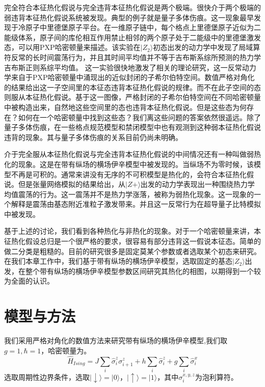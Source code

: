 完全符合本征热化假说与完全违背本征热化假说是两个极端。很快介于两个极端的弱违背本征热化假说系统被发现。典型的例子就是量子多体伤痕。这一现象最早发现于冷原子中里德堡原子平台\cite{bernien2017probing}。在一维原子链中，每个格点上里德堡原子近似为二能级体系，原子间的库伦相互作用禁止相邻的两个原子处于二能级中的里德堡激发态，可以用PXP哈密顿量来描述。该实验在$|Z_2\rangle$初态出发的动力学中发现了局域算符反常的长时间震荡行为，并且其时间平均值并不等于吉布斯系综所预测的热力学吉布斯正则系综平均值。
这一实验很快地激发了相关的理论研究\cite{turner2018weak,Turner2018quantum,Ho2019periodic,Choi2019emergent,Michailidis2020slow,serbyn2021quantum,Yao2022quantum}，这一反常动力学来自于PXP哈密顿量中涌现出的近似封闭的子希尔伯特空间。数值严格对角化的结果给出这一子空间里的本征态违背本征热化假说的规律。而不在此子空间的态则服从本征热化假说。基于这一图像，严格封闭的子希尔伯特空间在不同哈密顿量中被构造出来\cite{Shiraishi2017Systematic,Moudgalya2018exact,Moudgalya2018entanglement,Khemani2020lacalization,Moudgalya2020eta,Lin2019Exact,Schecter2019weak,Mark2020unified,Mark2020eta,Pakrouski2020many,Ren2021quasi,ODea2020from}，自然地这些空间里的态也违背本征热化假说。但是这些态为何存在？如何在一个哈密顿量中找到这些态？我们离这些问题的答案依然很遥远。除了量子多体伤痕，在一些格点规范模型\cite{magnifico2020real,Chanda2020confinement,Borla2020confined}和禁闭模型\cite{Nandkishore2017many,kormos2017real,Robinson2019signature,Yang2020Hilbert,Castro2020entanglement}中也有观测到这种弱本征热化假说违背的现象。其与量子多体伤痕的关系目前仍尚未明确\cite{serbyn2021quantum}。


介于完全服从本征热化假说与完全违背本征热化假说的中间情况还有一种叫做弱热化的现象\cite{banuls2011strong}。这是在带有纵场的横场伊辛模型中被发现的。当纵场不为零时候，该模型不再是可积的。通常来讲没有无序的不可积模型是热化的，会符合本征热化假说。但是张量网络模拟的结果给出，从$|Z+\rangle$出发的动力学表现出一种围绕热力学均值震荡的行为。这一震荡并不是热力学涨落，被称为弱热化现象。这一现象的一个解释是震荡由基态附近准粒子激发带来\cite{Lin2017quasiparticle}。并且这一反常行为在超导量子比特模拟中被发现\cite{Chen2021observation}。

基于上述的讨论，我们看到各种热化与非热化的现象。对于一个哈密顿量来讲，本征热化假设总归是一个很严格的要求，很容易有部分违背这一假说本征态。简单的做二分类是粗糙的。目前的研究很多是固定莫某个参数或者选取某个初态来研究。在我们本章工作中，我们基于带有纵场的横场伊辛模型，选取固定的基态$|Z_2\rangle$出发，在整个带有纵场的横场伊辛模型参数区间研究其热化的相图，以期得到一个较为全面的认识。

\section{模型与方法}\label{4sec:method}
我们采用严格对角化的数值方法来研究带有纵场的横场伊辛模型,我们取$g=1,\hbar=1$，哈密顿量为。
\begin{equation}
\hat{H}_{Ising} = J\sum_{i}\hat{\sigma}^z_i\sigma^z_{i+1} + h\sum_{i}\hat{\sigma}^z_i + g\sum_i\hat{\sigma}^x_i
\label{Ising}
\end{equation}
选取周期性边界条件，选取$|\downarrow\rangle=|0\rangle$，$|\uparrow\rangle=|1\rangle$，其中$\sigma_i^{x,y,z}$为泡利算符。


